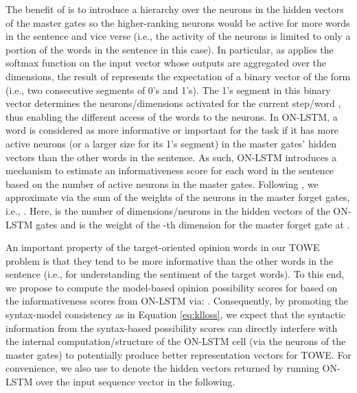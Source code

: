 \documentclass[11pt,a4paper]{article}
\begin{document}
The benefit of  is to introduce a hierarchy over the neurons in the hidden vectors of the master gates so the higher-ranking neurons would be active for more words in the sentence and vice verse (i.e., the activity of the neurons is limited to only a portion of the words in the sentence in this case). In particular, as  applies the softmax function on the input vector whose outputs are aggregated over the dimensions, the result of  represents the expectation of a binary vector of the form  (i.e., two consecutive segments of 0's and 1's). The 1's segment in this binary vector determines the neurons/dimensions activated for the current step/word , thus enabling the different access of the words to the neurons. In ON-LSTM, a word is considered as more informative or important for the task if it has more active neurons (or a larger size for its 1's segment) in the master gates' hidden vectors than the other words in the sentence. As such, ON-LSTM introduces a mechanism to estimate an informativeness score  for each word  in the sentence based on the number of active neurons in the master gates. Following \citep{Shen2019ordered}, we approximate  via the sum of the weights of the neurons in the master forget gates, i.e., . Here,  is the number of dimensions/neurons in the hidden vectors of the ON-LSTM gates and  is the weight of the -th dimension for the master forget gate  at .








An important property of the target-oriented opinion words in our TOWE problem is that they tend to be more informative than the other words in the sentence (i.e., for understanding the sentiment of the target words). To this end, we propose to compute the model-based opinion possibility scores  for  based on the informativeness scores  from ON-LSTM via: . Consequently, by promoting the syntax-model consistency as in Equation \ref{eq:klloss}, we expect that the syntactic information from the syntax-based possibility scores can directly interfere with the internal computation/structure of the ON-LSTM cell (via the neurons of the master gates) to potentially produce better representation vectors for TOWE. For convenience, we also use  to denote the hidden vectors returned by running ON-LSTM over the input sequence vector  in the following.
\end{document}
